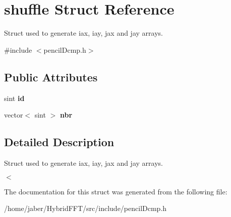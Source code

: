 \hypertarget{structshuffle}{}\section{shuffle Struct Reference}
\label{structshuffle}


Struct used to generate iax, iay, jax and jay arrays.  




{\ttfamily \#include $<$pencil\+Dcmp.\+h$>$}

\subsection*{Public Attributes}
\begin{DoxyCompactItemize}
\item 
\mbox{\label{structshuffle_a819f02c2b34a3f308c14852007ae188f}} 
sint {\bfseries id}
\item 
\mbox{\label{structshuffle_ad74caeaa9032ec25166a6685f8b1dc71}} 
vector$<$ sint $>$ {\bfseries nbr}
\end{DoxyCompactItemize}


\subsection{Detailed Description}
Struct used to generate iax, iay, jax and jay arrays. 

$<$ 

The documentation for this struct was generated from the following file\+:\begin{DoxyCompactItemize}
\item 
/home/jaber/\+Hybrid\+F\+F\+T/src/include/pencil\+Dcmp.\+h\end{DoxyCompactItemize}
